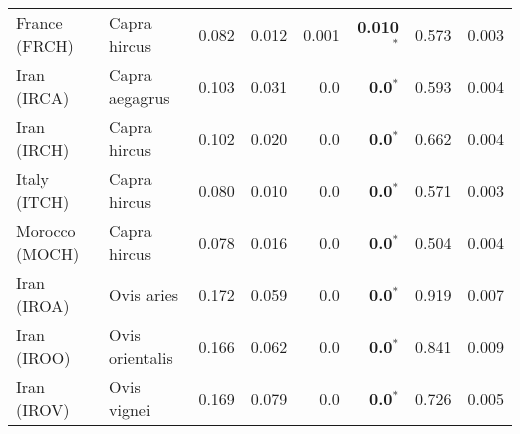 \begin{center}
\begin{adjustbox}{width = 1\textwidth}
\begin{tabular}{|l|l|r|r|r|r|r|r|}
                  France (FRCH) &         Capra hircus &                                              0.082 &                                              0.012 &            0.001 &                  \textbf{0.010}$\bm{^*}$ &                                              0.573 &              0.003 \\
                    Iran (IRCA) &       Capra aegagrus &                                              0.103 &                                              0.031 &              0.0 &                    \textbf{0.0}$\bm{^*}$ &                                              0.593 &              0.004 \\
                    Iran (IRCH) &         Capra hircus &                                              0.102 &                                              0.020 &              0.0 &                    \textbf{0.0}$\bm{^*}$ &                                              0.662 &              0.004 \\
                   Italy (ITCH) &         Capra hircus &                                              0.080 &                                              0.010 &              0.0 &                    \textbf{0.0}$\bm{^*}$ &                                              0.571 &              0.003 \\
                 Morocco (MOCH) &         Capra hircus &                                              0.078 &                                              0.016 &              0.0 &                    \textbf{0.0}$\bm{^*}$ &                                              0.504 &              0.004 \\
                    Iran (IROA) &           Ovis aries &                                              0.172 &                                              0.059 &              0.0 &                    \textbf{0.0}$\bm{^*}$ &                                              0.919 &              0.007 \\
                    Iran (IROO) &      Ovis orientalis &                                              0.166 &                                              0.062 &              0.0 &                    \textbf{0.0}$\bm{^*}$ &                                              0.841 &              0.009 \\
                    Iran (IROV) &          Ovis vignei &                                              0.169 &                                              0.079 &              0.0 &                    \textbf{0.0}$\bm{^*}$ &                                              0.726 &              0.005 \\

\end{tabular}
\end{adjustbox}
\end{center}
